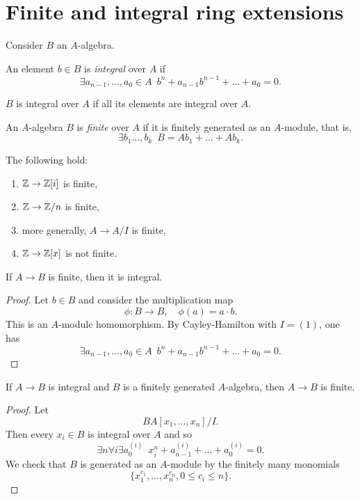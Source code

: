 \section{Finite and integral ring extensions}
Consider $B$ an $A$-algebra.

\begin{df}
  An element $b \in B$ is \textit{integral} over $A$ if
  \[ \exists a_{n-1}, \dotsc, a_0 \in A \enspace b^n + a_{n-1} b^{n-1} + \dotso + a_0 = 0.\]

  $B$ is integral over $A$ if all its elements are integral over $A$.
\end{df}

\begin{df}
  An $A$-algebra $B$ is \textit{finite} over $A$ if it is finitely generated as an $A$-module, that is,
  \[ \exists b_1 \dotsc, b_k \enspace B = A b_1 + \dotso + A b_k.\]
\end{df}

\begin{example}
  The following hold:
  \begin{enumerate}
  \item $\mathbb Z \to \mathbb Z[i]$ is finite,
  \item $\mathbb Z \to \mathbb Z /{n}$ is finite,
  \item more generally, $A \to A/{I}$ is finite,
  \item $\mathbb Z \to \mathbb Z[x]$ is not finite.
  \end{enumerate}
\end{example}

\begin{lemma}
  If $A \to B$ is finite, then it is integral.
\end{lemma}
\begin{proof}
  Let $b \in B$ and consider the multiplication map
  \[ \phi \colon B \to B, \quad \phi(a) = a \cdot b.\]
  This is an $A$-module homomorphism.
  By Cayley-Hamilton with $I = (1)$, one has
  \[ \exists a_{n-1}, \dotsc, a_0 \in A \enspace b^n + a_{n-1} b^{n-1} + \dotso + a_0 = 0.\]
\end{proof}

\begin{lemma}
  \label{lem-integral-fingen-fin}
  If $A \to B$ is integral and $B$ is a finitely generated $A$-algebra, then $A \to B$ is finite.
\end{lemma}
\begin{proof}
  Let
  \[ B A[x_1, \dotsc, x_n]/{I}.\]
  Then every $x_i \in B$ is integral over $A$ and so
  \[ \exists n \forall i \exists a_0^{(i)} \enspace x_i^n + a_{n-1}^{(i)} + \dotso + a_0^{(i)} = 0.\]
  We check that $B$ is generated as an $A$-module by the finitely many monomials
  \[ \{ x_1^{c_1}, \dotsc, x_n^{c_n}, 0 \leq c_i \leq n\}.\]
\end{proof}

